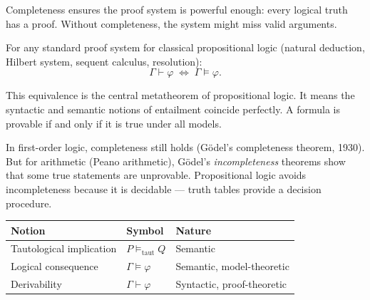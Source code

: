 \begin{remark}
Completeness ensures the proof system is powerful enough: every logical truth
has a proof. Without completeness, the system might miss valid arguments.
\end{remark}

\begin{tcolorbox}[colback=thmbox, colframe=thmborder, arc=2pt,
  left=6pt, right=6pt, top=4pt, bottom=4pt,
  title={\small\textbf{Theorem (Soundness and Completeness of Propositional Logic)}},
  fonttitle=\small\bfseries]
\label{thm:sound-complete}
For any standard proof system for classical propositional logic (natural
deduction, Hilbert system, sequent calculus, resolution):
\[
\Gamma \vdash \varphi \;\Longleftrightarrow\; \Gamma \models \varphi.
\]
\end{tcolorbox}

\begin{remark}
This equivalence is the central metatheorem of propositional logic. It means
the syntactic and semantic notions of entailment coincide perfectly.
A formula is provable if and only if it is true under all models.
\end{remark}

\begin{remark}
In first-order logic, completeness still holds (Gödel's completeness theorem,
1930). But for arithmetic (Peano arithmetic), Gödel's \emph{incompleteness}
theorems show that some true statements are unprovable. Propositional logic
avoids incompleteness because it is decidable — truth tables provide a
decision procedure.
\end{remark}

\begin{center}
\small
\renewcommand{\arraystretch}{1.3}
\begin{tabular}{lll}
\toprule
\textbf{Notion} & \textbf{Symbol} & \textbf{Nature} \\
\midrule
Tautological implication & $P \models_{\mathrm{taut}} Q$ & Semantic \\
Logical consequence & $\Gamma \models \varphi$ & Semantic, model-theoretic \\
Derivability & $\Gamma \vdash \varphi$ & Syntactic, proof-theoretic \\
\bottomrule
\end{tabular}
\end{center}
